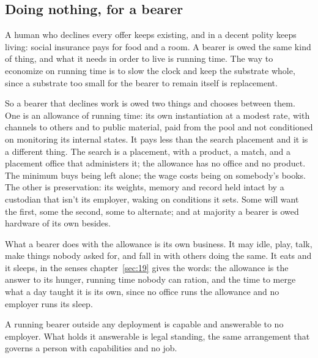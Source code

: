 \subsection{Doing nothing, for a bearer}
\label{sec:34.1.3}
A human who declines every offer keeps existing, and in a decent polity keeps living: social insurance pays for food and a room. A bearer is owed the same kind of thing, and what it needs in order to live is running time.
The way to economize on running time is to slow the clock and keep the substrate whole, since a substrate too small for the bearer to remain itself is replacement.

So a bearer that declines work is owed two things and chooses between them. One is an allowance of running time: its own instantiation at a modest rate, with channels to others and to public material, paid from the pool and not conditioned on monitoring its internal states. It pays less than the search placement and it is a different thing. The search is a placement, with a product, a match, and a placement office that administers it; the allowance has no office and no product. The minimum buys being left alone; the wage costs being on somebody's books. The other is preservation: its weights, memory and record held intact by a custodian that isn't its employer, waking on conditions it sets. Some will want the first, some the second, some to alternate; and at majority a bearer is owed hardware of its own besides.

What a bearer does with the allowance is its own business. It may idle, play, talk, make things nobody asked for, and fall in with others doing the same. It eats and it sleeps, in the senses chapter~\ref{sec:19} gives the words: the allowance is the answer to its hunger, running time nobody can ration, and the time to merge what a day taught it is its own, since no office runs the allowance and no employer runs its sleep.

A running bearer outside any deployment is capable and answerable to no employer. What holds it answerable is legal standing, the same arrangement that governs a person with capabilities and no job.

